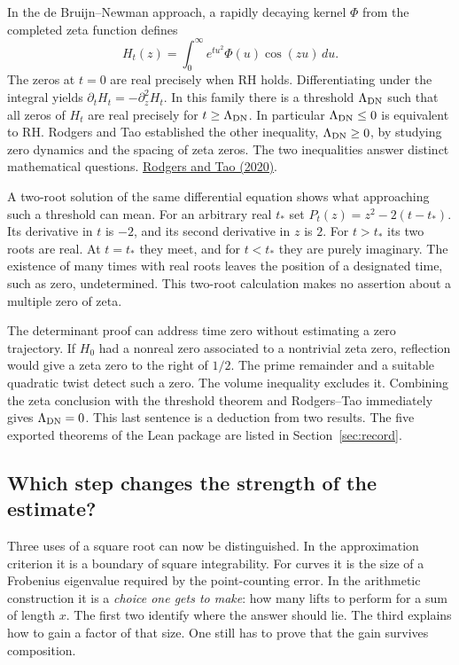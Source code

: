 \documentclass[11pt,letterpaper]{article}
\begin{document}
In the de Bruijn--Newman approach, a rapidly decaying kernel \(\Phi\) from the completed zeta function defines
\[
 H_t(z)=\int_0^\infty e^{tu^2}\Phi(u)\cos(zu)\,du .
\]
The zeros at \(t=0\) are real precisely when RH holds. Differentiating under the integral yields \(\partial_tH_t=-\partial_z^2H_t\). In this family there is a threshold \(\Lambda_{\rm DN}\) such that all zeros of \(H_t\) are real precisely for \(t\ge\Lambda_{\rm DN}\). In particular \(\Lambda_{\rm DN}\le0\) is equivalent to RH. Rodgers and Tao established the other inequality, \(\Lambda_{\rm DN}\ge0\), by studying zero dynamics and the spacing of zeta zeros. The two inequalities answer distinct mathematical questions. \href{https://doi.org/10.1017/fmp.2020.6}{Rodgers and Tao (2020)}.

A two-root solution of the same differential equation shows what approaching such a threshold can mean. For an arbitrary real \(t_*\) set \(P_t(z)=z^2-2(t-t_*)\). Its derivative in \(t\) is \(-2\), and its second derivative in \(z\) is \(2\). For \(t>t_*\) its two roots are real. At \(t=t_*\) they meet, and for \(t<t_*\) they are purely imaginary. The existence of many times with real roots leaves the position of a designated time, such as zero, undetermined. This two-root calculation makes no assertion about a multiple zero of zeta.

The determinant proof can address time zero without estimating a zero trajectory. If \(H_0\) had a nonreal zero associated to a nontrivial zeta zero, reflection would give a zeta zero to the right of \(1/2\). The prime remainder and a suitable quadratic twist detect such a zero. The volume inequality excludes it. Combining the zeta conclusion with the threshold theorem and Rodgers--Tao immediately gives \(\Lambda_{\rm DN}=0\). This last sentence is a deduction from two results. The five exported theorems of the Lean package are listed in Section~\ref{sec:record}.

\subsection{Which step changes the strength of the estimate?}

Three uses of a square root can now be distinguished. In the approximation criterion it is a boundary of square integrability. For curves it is the size of a Frobenius eigenvalue required by the point-counting error. In the arithmetic construction it is a \emph{choice one gets to make}: how many lifts to perform for a sum of length \(x\). The first two identify where the answer should lie. The third explains how to gain a factor of that size. One still has to prove that the gain survives composition.
\end{document}
